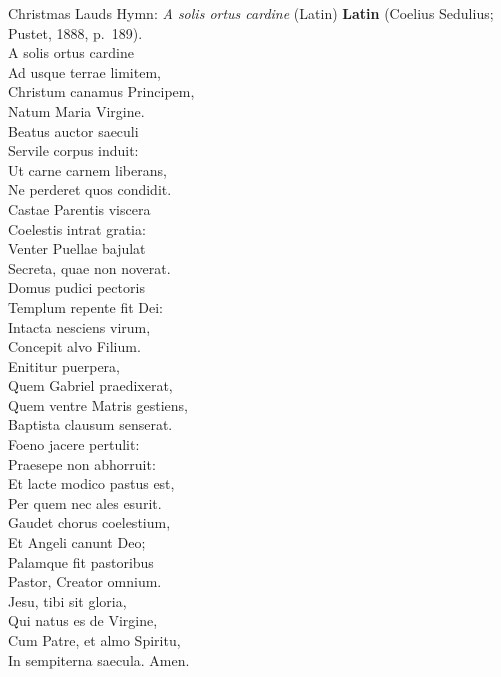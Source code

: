\begin{massbox}{Christmas Lauds Hymn: \textit{A solis ortus cardine} (Latin)}
\textbf{Latin} (Coelius Sedulius; Pustet, 1888, p.~189).\\
A solis ortus cardine\\
Ad usque terrae limitem,\\
Christum canamus Principem,\\
Natum Maria Virgine.\\[0.4em]
Beatus auctor saeculi\\
Servile corpus induit:\\
Ut carne carnem liberans,\\
Ne perderet quos condidit.\\[0.4em]
Castae Parentis viscera\\
Coelestis intrat gratia:\\
Venter Puellae bajulat\\
Secreta, quae non noverat.\\[0.4em]
Domus pudici pectoris\\
Templum repente fit Dei:\\
Intacta nesciens virum,\\
Concepit alvo Filium.\\[0.4em]
Enititur puerpera,\\
Quem Gabriel praedixerat,\\
Quem ventre Matris gestiens,\\
Baptista clausum senserat.\\[0.4em]
Foeno jacere pertulit:\\
Praesepe non abhorruit:\\
Et lacte modico pastus est,\\
Per quem nec ales esurit.\\[0.4em]
Gaudet chorus coelestium,\\
Et Angeli canunt Deo;\\
Palamque fit pastoribus\\
Pastor, Creator omnium.\\[0.4em]
Jesu, tibi sit gloria,\\
Qui natus es de Virgine,\\
Cum Patre, et almo Spiritu,\\
In sempiterna saecula. Amen.
\end{massbox}

